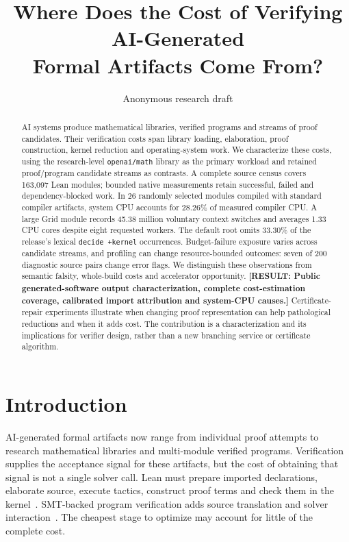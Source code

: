 \documentclass[10pt,twocolumn]{article}
\title{Where Does the Cost of Verifying AI-Generated\\Formal Artifacts Come From?}
\author{Anonymous research draft}
\date{}
\newcommand{\missing}[1]{\textbf{[RESULT: #1]}}
\begin{document}
\maketitle
\begin{abstract}
AI systems produce mathematical libraries, verified programs and streams of
proof candidates. Their verification costs span library loading, elaboration,
proof construction, kernel reduction and operating-system work.
We characterize these costs, using the research-level \texttt{openai/math}
library as the primary workload and retained proof/program candidate streams
as contrasts. A complete source census covers 163,097 Lean modules; bounded
native measurements retain successful, failed and dependency-blocked work.
In 26 randomly selected modules compiled with standard compiler artifacts,
system CPU accounts for 28.26\% of measured compiler CPU. A large Grid module
records 45.38 million voluntary context switches and averages 1.33 CPU cores
despite eight requested workers. The default root omits 33.30\% of the
release's lexical \texttt{decide +kernel} occurrences.
Budget-failure exposure varies across candidate streams, and profiling can
change resource-bounded outcomes: seven of 200 diagnostic source pairs change
error flags. We distinguish these observations from semantic falsity,
whole-build costs and accelerator opportunity.
\missing{Public generated-software output characterization, complete
cost-estimation coverage, calibrated import attribution and system-CPU causes.}
Certificate-repair experiments illustrate when changing proof representation
can help pathological reductions and when it adds cost. The contribution is
a characterization and its implications for verifier design, rather than a
new branching service or certificate algorithm.
\end{abstract}

\section{Introduction}
AI-generated formal artifacts now range from individual proof attempts to
research mathematical libraries and multi-module verified programs.
Verification supplies the acceptance signal for these artifacts, but the
cost of obtaining that signal is not a single solver call.
Lean must prepare imported declarations, elaborate source, execute tactics,
construct proof terms and check them in the kernel~\cite{lean4}.
SMT-backed program verification adds source translation and solver
interaction~\cite{verus}. The cheapest stage to optimize may account for
little of the complete cost.
\end{document}
